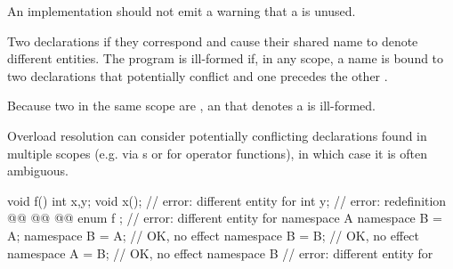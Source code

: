 \documentclass{wg21}
\begin{document}
{\begin{addedblock}
\recommended
An implementation should not emit a warning that
a 
is unused.
\end{addedblock}

Two declarations 
if they correspond and
cause their shared name to denote different entities.
The program is ill-formed
if, in any scope, a name is bound to two declarations
that potentially conflict and one precedes the other .

\begin{addedblock}
\begin{note}
Because two  in the same scope
are , an  that denotes a
 is ill-formed.
\end{note}
\end{addedblock}


\begin{note}
	Overload resolution can consider potentially conflicting declarations
	found in multiple scopes
	(e.g. via s or for operator functions),
	in which case it is often ambiguous.
\end{note}
\begin{example}
	\begin{codeblock}
		void f() {
			int x,y;
			void x();             // error: different entity for 
			int y;                  // error: redefinition
			@@
			@@
			@@
		}
		enum { f };             // error: different entity for 
		namespace A {}
		namespace B = A;
		namespace B = A;        // OK, no effect
		namespace B = B;        // OK, no effect
		namespace A = B;        // OK, no effect
		namespace B {}          // error: different entity for 
	\end{codeblock}
\end{example}

}
\end{document}
